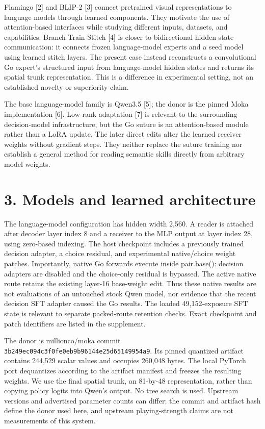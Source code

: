 \documentclass[11pt]{article}
\begin{document}
Flamingo [2] and BLIP-2 [3] connect pretrained visual representations to language models through learned components. They motivate the use of attention-based interfaces while studying different inputs, datasets, and capabilities. Branch-Train-Stitch [4] is closer to bidirectional hidden-state communication: it connects frozen language-model experts and a seed model using learned stitch layers. The present case instead reconstructs a convolutional Go expert's structured input from language-model hidden states and returns its spatial trunk representation. This is a difference in experimental setting, not an established novelty or superiority claim.

The base language-model family is Qwen3.5 [5]; the donor is the pinned Moka implementation [6]. Low-rank adaptation [7] is relevant to the surrounding decision-model infrastructure, but the Go suture is an attention-based module rather than a LoRA update. The later direct edits alter the learned receiver weights without gradient steps. They neither replace the suture training nor establish a general method for reading semantic skills directly from arbitrary model weights.

\section*{3. Models and learned architecture}
The language-model configuration has hidden width 2,560. A reader is attached after decoder layer index 8 and a receiver to the MLP output at layer index 28, using zero-based indexing. The host checkpoint includes a previously trained decision adapter, a choice residual, and experimental native/choice weight patches. Importantly, native Go forwards execute inside pair.base(): decision adapters are disabled and the choice-only residual is bypassed. The active native route retains the existing layer-16 base-weight edit. Thus these native results are not evaluations of an untouched stock Qwen model, nor evidence that the recent decision SFT adapter caused the Go results. The loaded 49,152-exposure SFT state is relevant to separate packed-route retention checks. Exact checkpoint and patch identifiers are listed in the supplement.

The donor is millionco/moka commit \texttt{3b249ec0\allowbreak 94c3f0fe\allowbreak 0eb9b961\allowbreak 44e25d65\allowbreak 149954a9}. Its pinned quantized artifact contains 244,529 scalar values and occupies 260,048 bytes. The local PyTorch port dequantizes according to the artifact manifest and freezes the resulting weights. We use the final spatial trunk, an 81-by-48 representation, rather than copying policy logits into Qwen's output. No tree search is used. Upstream versions and advertised parameter counts can differ; the commit and artifact hash define the donor used here, and upstream playing-strength claims are not measurements of this system.
\end{document}
